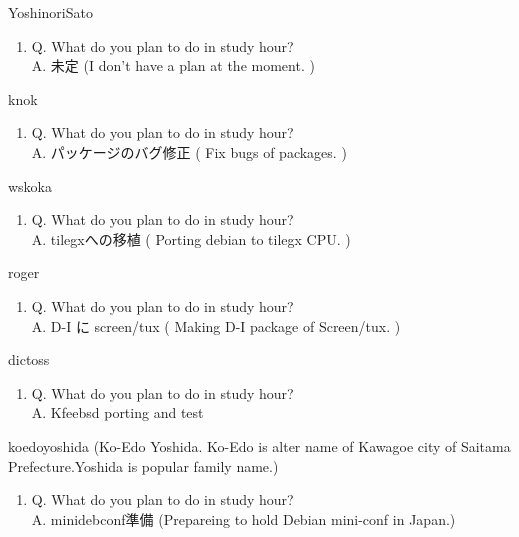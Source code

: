 \begin{prework}{ YoshinoriSato }
  \begin{enumerate}
  \item Q. What do you plan to do in study hour?\\
    A. 未定 (I don't have a plan at the moment. )
  \end{enumerate}
\end{prework}

\begin{prework}{ knok }
  \begin{enumerate}
  \item Q. What do you plan to do in study hour?\\
    A. パッケージのバグ修正 ( Fix bugs of packages. )
  \end{enumerate}
\end{prework}

\begin{prework}{ wskoka }
  \begin{enumerate}
  \item Q. What do you plan to do in study hour?\\
    A. tilegxへの移植 ( Porting debian to tilegx CPU. )
  \end{enumerate}
\end{prework}

\begin{prework}{ roger }
  \begin{enumerate}
  \item Q. What do you plan to do in study hour?\\
    A. D-I に screen/tux ( Making D-I package of Screen/tux. )
  \end{enumerate}
\end{prework}

\begin{prework}{ dictoss }
  \begin{enumerate}
  \item Q. What do you plan to do in study hour?\\
    A. Kfeebsd porting and test
  \end{enumerate}
\end{prework}

\begin{prework}{ koedoyoshida }
 (Ko-Edo Yoshida. Ko-Edo is alter name of Kawagoe city of Saitama Prefecture.Yoshida is popular family name.)
  \begin{enumerate}
  \item Q. What do you plan to do in study hour?\\
    A. minidebconf準備 (Prepareing to hold Debian mini-conf in Japan.)
  \end{enumerate}
\end{prework}

